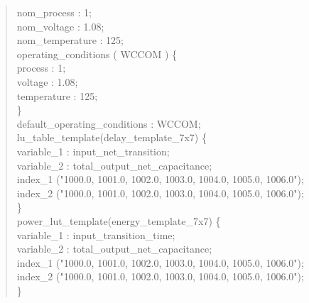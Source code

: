 \documentclass[a4paper]{article}
\begin{document}
\begin{verse}
\hspace*{2em}nom\_process : 1;\\
\hspace*{2em}nom\_voltage : 1.08;\\
\hspace*{2em}nom\_temperature : 125;\\
\hspace*{2em}operating\_conditions ( WCCOM ) \{\\
\hspace*{5em}process : 1;\\
\hspace*{5em}voltage : 1.08;\\
\hspace*{5em}temperature : 125;\\
\hspace*{2em}\}\\
\hspace*{2em}default\_operating\_conditions : WCCOM;\\
\vspace*{1em}
\hspace*{2em}lu\_table\_template(delay\_template\_7x7) \{\\
\hspace*{4em}variable\_1 : input\_net\_transition;\\
\hspace*{4em}variable\_2 : total\_output\_net\_capacitance;\\
\hspace*{4em}index\_1 ("1000.0, 1001.0, 1002.0, 1003.0, 1004.0, 1005.0, 1006.0");\\
\hspace*{4em}index\_2 ("1000.0, 1001.0, 1002.0, 1003.0, 1004.0, 1005.0, 1006.0");\\
\hspace*{2em}\}\\
\hspace*{2em}power\_lut\_template(energy\_template\_7x7) \{\\
\hspace*{4em}variable\_1 : input\_transition\_time;\\
\hspace*{4em}variable\_2 : total\_output\_net\_capacitance;\\
\hspace*{4em}index\_1 ("1000.0, 1001.0, 1002.0, 1003.0, 1004.0, 1005.0, 1006.0");\\
\hspace*{4em}index\_2 ("1000.0, 1001.0, 1002.0, 1003.0, 1004.0, 1005.0, 1006.0");\\
\hspace*{2em}\}\\
\vspace*{1em}
\end{verse}
\end{document}
